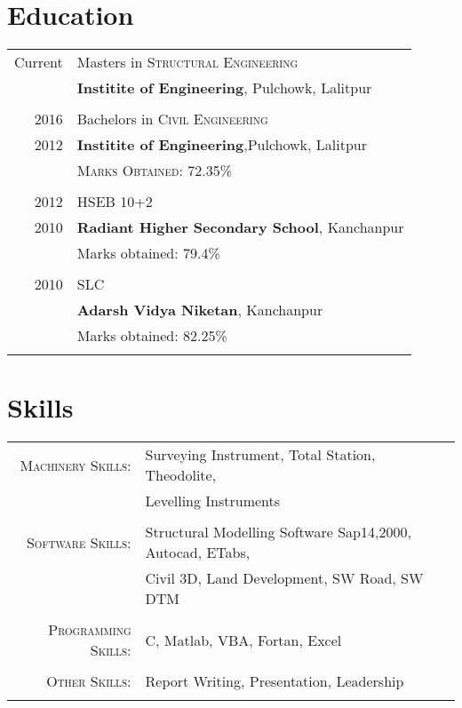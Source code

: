 \documentclass[a4paper,10pt]{article}
\begin{document}
\section{Education}
\begin{tabular}{rl}	
Current  & Masters in \textsc{Structural Engineering}\\
& \textbf{Institite of Engineering}, Pulchowk, Lalitpur\\
\\
2016  & Bachelors in \textsc{Civil Engineering}\\
2012 & \textbf{Institite of Engineering},Pulchowk, Lalitpur\\
& \normalsize \textsc{Marks Obtained}: 72.35\%\\\\
2012 & HSEB 10+2 \\ 
2010 &\normalsize\textbf{Radiant Higher Secondary School}, Kanchanpur\\
&Marks obtained: 79.4\%\\&\\
2010& SLC\\ & \textbf{Adarsh Vidya Niketan}, Kanchanpur\\
&Marks obtained: 82.25\%\\&\\
\end{tabular}



\section{Skills}
\begin{tabular}{rl}	
\textsc{Machinery Skills:} &Surveying Instrument, Total Station, Theodolite, \\& Levelling Instruments \\\\
\textsc{Software Skills:}  & Structural Modelling Software Sap14,2000, Autocad, ETabs, \\& Civil 3D, Land Development, SW Road, SW DTM\\\\
\textsc{Programming Skills:} & C, Matlab, VBA, Fortan, Excel\\\\
\textsc{Other Skills:} & Report Writing, Presentation, Leadership\\\\
\end{tabular}
\end{document}
